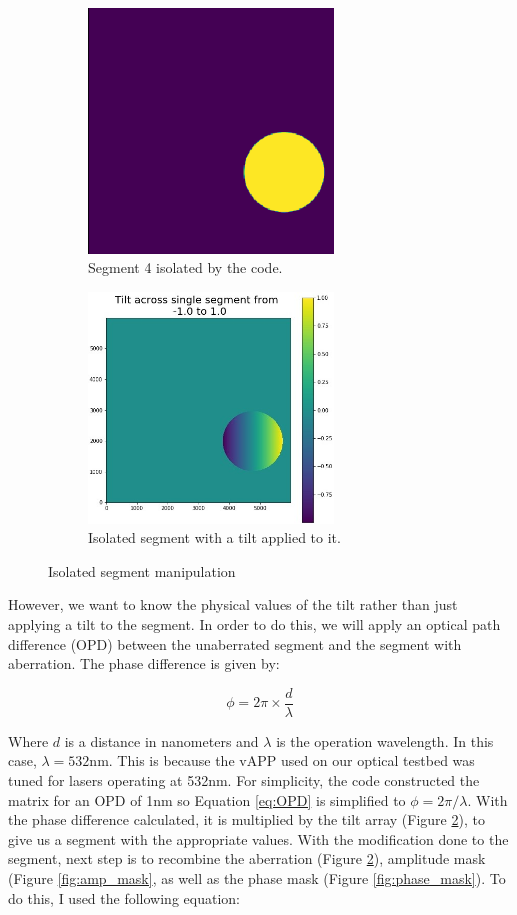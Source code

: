 \begin{figure}[H]
\centering
\begin{subfigure}{.5\textwidth}
  \centering
  \includegraphics[width=6.5cm]{Figures/isolated_seg.png}
  \caption{Segment 4 isolated by the code.}
  \label{fig:single_seg}
\end{subfigure}%
\begin{subfigure}{.5\textwidth}
  \centering
  \includegraphics[width=6.5cm]{Figures/tip_single_seg.jpg}
  \caption{Isolated segment with a tilt applied to it.}
  \label{fig:tilt_seg}
\end{subfigure}
\caption{Isolated segment manipulation}
\label{fig:isolated_seg}
\end{figure}

However, we want to know the physical values of the tilt rather than just applying a tilt to the segment.  In order
to do this, we will apply an optical path difference (OPD) between the unaberrated segment and the segment with
aberration.  The phase difference is given by:

\begin{equation}
    \phi = 2 \pi \times \frac{d}{\lambda}
    \label{eq:OPD}
\end{equation}

Where $d$ is a distance in nanometers and $\lambda$ is the operation wavelength.  In this case, $\lambda = 532$nm. 
This is because the vAPP used on our optical testbed was tuned for lasers operating at 532nm.  For simplicity, the
code constructed the matrix for an OPD of 1nm so Equation \ref{eq:OPD} is simplified to $\phi = 2 \pi / \lambda$. 
With the phase difference calculated, it is multiplied by the tilt array (Figure \ref{fig:tilt_seg}), to give us a
segment with the appropriate values.  With the modification done to the segment, next step is to recombine the
aberration (Figure \ref{fig:tilt_seg}), amplitude mask (Figure \ref{fig:amp_mask}, as well as the phase mask (Figure
\ref{fig:phase_mask}).  To do this, I used the following equation:

